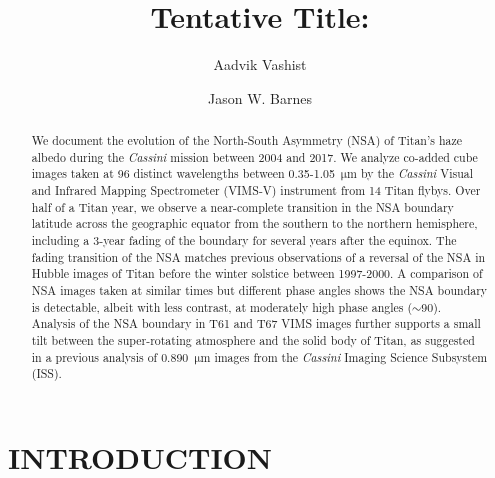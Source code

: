 \documentclass[tighten,linenumbers,twocolumn]{aastex631}
\def\um{\mathrm{\mu m}}
\begin{document}
\title{Tentative Title:}
\author[0000-0002-6318-7226]{Aadvik Vashist}
\author[0000-0002-7755-3530]{Jason W. Barnes}



\begin{abstract}
We document the evolution of the North-South Asymmetry (NSA) of Titan's haze albedo during the \textit{Cassini} mission between 2004 and 2017.
We analyze co-added cube images taken at 96 distinct wavelengths between 0.35-1.05~$\um$ by the \textit{Cassini} Visual and Infrared Mapping Spectrometer (VIMS-V) instrument from 14 Titan flybys.
Over half of a Titan year, we observe a near-complete transition in the NSA boundary latitude across the geographic equator from the southern to the northern hemisphere, including a 3-year fading of the boundary for several years after the equinox.
The fading transition of the NSA matches previous observations of a reversal of the NSA in Hubble images of Titan before the winter solstice between 1997-2000. A comparison of NSA images taken at similar times but different phase angles shows the NSA boundary is detectable, albeit with less contrast, at moderately high phase angles ($\sim$90\textdegree). Analysis of the NSA boundary in T61 and T67 VIMS images further supports a small tilt between the super-rotating atmosphere and the solid body of Titan, as suggested in a previous analysis of 0.890~$\um$ images from the \textit{Cassini} Imaging Science Subsystem (ISS). 
\end{abstract}



\section{INTRODUCTION}
\end{document}
